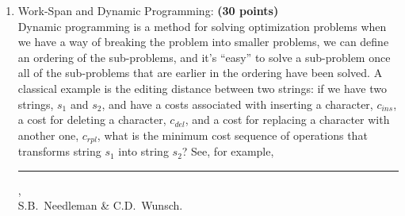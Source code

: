 \documentclass{article}
\newenvironment{answer}
{\color{blue}}
{\normalfont}
\begin{document}
\begin{enumerate}
\begin{enumerate}
              \item \textbf{Measure Speed-Up} (10 points)\\
                    Measure the speed-up for your implementation of .
                    Make your timing measurements on  or .
                    This time, you decide how to make your measurments.
                    Please describe how you measured the speed-ups, and give your reasons for your
                    design choices.

                    \begin{answer}
                        
                    \end{answer}
          \end{enumerate}
          \textbf{Hint:} This problem is a simple example of reduce.
          My  function is eight lines long,
          and my  function is three lines.
          The purpose of this problem is to reinforce using reduce and scan with another example.
          It should have been on HW2, but I hadn't worked out a ``gentle'' introduction to queueing
          theory in time for that assignment.
          We are deliberately giving you more flexiblity for the code writing and measurements.
          This is to give you experience applying the ideas you've learned in class.

    \item Work-Span and Dynamic Programming: \textbf{(30 points)}\\
          Dynamic programming is a method for solving optimization problems when we have a way of breaking the
          problem into smaller problems, we can define an ordering of the sub-problems, and it's ``easy'' to
          solve a sub-problem once all of the sub-problems that are earlier in the ordering have been solved.
          A classical example is the editing distance between two strings: if we have two strings, $s_1$ and $s_2$,
          and have a costs associated with inserting a character, $c_{\mathit{ins}}$,
          a cost for deleting a character, $c_{\mathit{del}}$, and
          a cost for replacing a character with another one, $c_{\mathit{rpl}}$,
          what is the minimum cost sequence of operations that transforms string $s_1$ into string $s_2$?
          See, for example,\\
          \rule{1.5em}{0ex}\textit{},\\
          S.B.\ Needleman \& C.D.\ Wunsch.


\end{enumerate}
\end{document}

